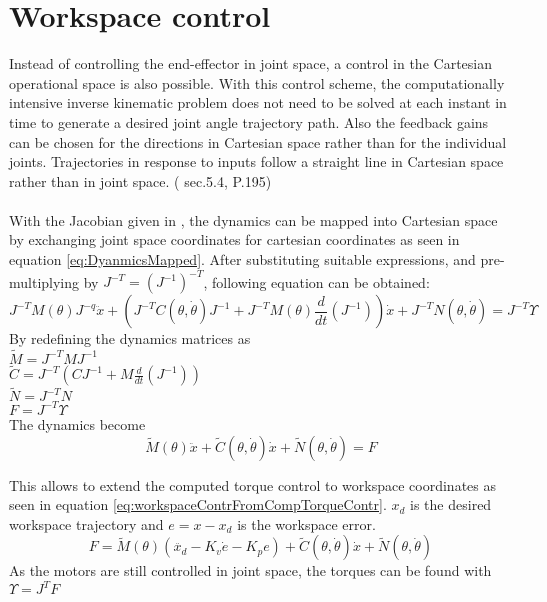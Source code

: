 \section{Workspace control}
Instead of controlling the end-effector in joint space, a control in the Cartesian operational space is also possible. 
With this control scheme, the computationally intensive inverse kinematic problem does not need to be solved at each instant in time to generate a desired joint angle trajectory path. Also the feedback gains can be chosen for the directions in Cartesian space rather than for the individual joints. Trajectories in response to inputs follow a straight line in Cartesian space rather than in joint space. (\cite{MathIntroRobManip} sec.5.4, P.195)\\
\\
With the Jacobian given in , the dynamics can be mapped into Cartesian space by exchanging joint space coordinates for cartesian coordinates as seen in equation \ref{eq:DyanmicsMapped}. After substituting suitable expressions, and pre-multiplying by $ J^{-T} = (J^{-1})^{-T}$, following equation can be obtained:\\
\begin{equation} \label{eq:DyanmicsMapped}
	J^{-T} M(\theta) J^{-q} \ddot{x} + (J^{-T} C(\theta,\dot{\theta}) J^{-1} +J^{-T} M(\theta) \frac{d}{dt} (J^{-1}))\dot{x} + J^{-T} N(\theta, \dot{\theta}) = J^{-T}  \Upsilon
\end{equation}
By redefining the dynamics matrices as\\
$ \tilde{M} = J^{-T} M J^{-1}$\\
$ \tilde{C} = J^{-T} (C J^{-1} + M \frac{d}{dt} (J^{-1}))$\\
$ \tilde{N} = J^{-T} N$\\
$ F = J^{-T} \Upsilon$\\
The dynamics become\\

\begin{equation}
	\tilde{M} (\theta) \ddot{x} + \tilde{C} (\theta, \dot{\theta}) \dot{x} + \tilde{N} (\theta,\dot{\theta}) = F
\end{equation}

This allows to extend the computed torque control to workspace coordinates as seen in equation \ref{eq:workspaceContrFromCompTorqueContr}. $x_d$ is the desired workspace trajectory and $ e=x-x_d$ is the workspace error. 
\begin{equation} \label{eq:workspaceContrFromCompTorqueContr}
	F=\tilde{M} (\theta) (\ddot{x_d} - K_v \dot{e} - K_p e ) + \tilde{C}(\theta,\dot{\theta})\dot{x} + \tilde{N}(\theta,\dot{\theta})
\end{equation}
As the motors are still controlled in joint space, the torques can be found with \\
$\Upsilon = J^T F$\\


